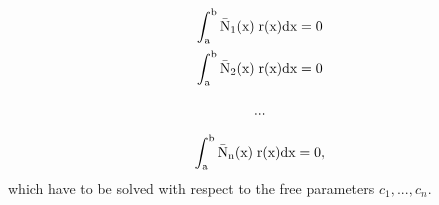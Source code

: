\begin{equation}
\renewcommand{\arraystretch}{2.5}
\begin{array}{c}
\displaystyle\rm
\int_a^b \bar{N}_1(x) \; r(x) dx = 0 \\
\displaystyle\rm
\int_a^b \bar{N}_2(x) \; r(x) dx = 0 \\
\displaystyle\rm  
 ...                                       \\
\displaystyle\rm
\int_a^b \bar{N}_n(x) \; r(x) dx = 0 ,\\
\end{array}
\label{eq:nResLoesung}
\end{equation}
which have to be solved with respect to the free parameters 
$ c_1,..., c_n.$

% 
% 
% 
